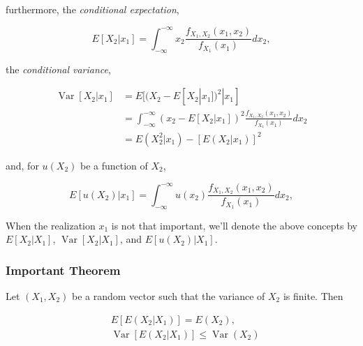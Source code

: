 \documentclass{article}
\begin{document}
                furthermore, the \textit{conditional expectation},

                \begin{equation*}
                    E[X_{2} | x_{1}] = \int_{-\infty}^{-\infty} x_{2} \frac{
                     f_{X_{1}, X_{2}}(x_{1}, x_{2}) }{ f_{X_{1}}( x_{1}) } d x_{2},
                \end{equation*}

                the \textit{conditional variance},

                \begin{align*}
                    \operatorname{Var}[X_{2} | x_{1}]
                        &= E[(X_{2} -E[X_{2} | x_{1}])^2 | x_{1}] \\
                        &= \int_{-\infty}^{-\infty} (x_{2} - E[X_{2} | x_{1}])^2 \frac{
                         f_{X_{1}, X_{2}}(x_{1}, x_{2}) }{ f_{X_{1}}( x_{1}) } d x_{2} \\
                        &= E(X_{2}^{2}|x_{1}) - \left[ E(X_{2}|x_{1}) \right]^{2}
                \end{align*}

                and, for $ u(X_{2}) $ be a function of $ X_{2} $,

                \begin{equation*}
                    E[u(X_{2}) | x_{1}] = \int_{-\infty}^{-\infty} u(x_{2}) \frac{
                     f_{X_{1}, X_{2}}(x_{1}, x_{2}) }{ f_{X_{1}}( x_{1}) } d x_{2},
                \end{equation*}

                When the realization $ x_{1} $ is not that important, we'll denote the above concepts by
                $ E[X_{2}|X_{1}] $, $ \operatorname{Var}[X_{2}|X_{1}] $, and $ E[u(X_{2})|X_{1}] $.

                \subsubsection{Important Theorem}

                    Let $ ( X_{1}, X_{2} ) $ be a random vector such that the variance of $ X_{2} $ is finite. Then

                    \begin{align*}
                        & E[E(X_{2}|X_{1})] = E(X_{2}),\\
                        & \operatorname{Var}[E(X_{2}|X_{1})] \leq \operatorname{Var}(X_{2})
                    \end{align*}
\end{document}
